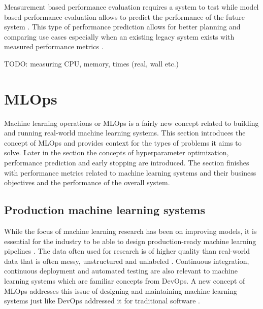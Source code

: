 Measurement based performance evaluation requires a system to test while model based performance evaluation allows to predict the performance of the future system \parencite{brunnertPerformanceorientedDevOpsResearch2015}. This type of performance prediction allows for better planning and comparing use cases especially when an existing legacy system exists with measured performance metrics \parencite{brunnertPerformanceorientedDevOpsResearch2015}.

TODO: measuring CPU, memory, times (real, wall etc.)

\section{MLOps} %
\label{sec:mldevops}

Machine learning operations or MLOps is a fairly new concept related to building and running real-world machine learning systems. This section introduces the concept of MLOps and provides context for the types of problems it aims to solve. Later in the section the concepts of hyperparameter optimization, performance prediction and early stopping are introduced. The section finishes with performance metrics related to machine learning systems and their business objectives and the performance of the overall system.

\subsection{Production machine learning systems}

While the focus of machine learning research  has been on improving models, it is essential for the industry to be able to design production-ready machine learning pipelines \parencite{posoldovaMachineLearningPipelines2020}. The data often used for research is of higher quality than real-world data that is often messy, unstructured and unlabeled \parencite{posoldovaMachineLearningPipelines2020}. Continuous integration, continuous deployment and automated testing are also relevant to machine learning systems \parencite{posoldovaMachineLearningPipelines2020} which are familiar concepts from DevOps. A new concept of MLOps addresses this issue of designing and maintaining machine learning systems just like DevOps addressed it for traditional software \parencite{kreuzbergerMachineLearningOperations2023}.

